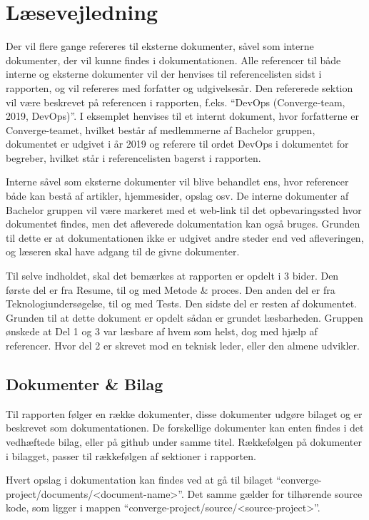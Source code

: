 \chapter{Læsevejledning}

Der vil flere gange refereres til eksterne dokumenter, såvel som interne dokumenter, der vil kunne findes i dokumentationen. Alle referencer til både interne og eksterne dokumenter vil der henvises til referencelisten sidst i rapporten, og vil refereres med forfatter og udgivelsesår. Den refererede sektion vil være beskrevet på referencen i rapporten, f.eks. “DevOps (Converge-team, 2019, DevOps)”. I eksemplet henvises til et internt dokument, hvor forfatterne er Converge-teamet, hvilket består af medlemmerne af Bachelor gruppen, dokumentet er udgivet i år 2019 og referere til ordet DevOps \cite[DevOps]{converge-terms} i dokumentet for begreber, hvilket står i referencelisten bagerst i rapporten.

Interne såvel som eksterne dokumenter vil blive behandlet ens, hvor referencer både kan bestå af artikler, hjemmesider, opslag osv. De interne dokumenter af Bachelor gruppen vil være markeret med et web-link til det opbevaringssted hvor dokumentet findes, men det afleverede dokumentation kan også bruges. Grunden til dette er at dokumentationen ikke er udgivet andre steder end ved afleveringen, og læseren skal have adgang til de givne dokumenter.

Til selve indholdet, skal det bemærkes at rapporten er opdelt i 3 bider. Den første del er fra Resume, til og med Metode \& proces. Den anden del er fra Teknologiundersøgelse, til og med Tests. Den sidste del er resten af dokumentet. Grunden til at dette dokument er opdelt sådan er grundet læsbarheden. Gruppen ønskede at Del 1 og 3 var læsbare af hvem som helst, dog med hjælp af referencer. Hvor del 2 er skrevet mod en teknisk leder, eller den almene udvikler.

\section{Dokumenter \& Bilag}

Til rapporten følger en række dokumenter, disse dokumenter udgøre bilaget og er beskrevet som dokumentationen. De forskellige dokumenter kan enten findes i det vedhæftede bilag, eller på github under samme titel. Rækkefølgen på dokumenter i bilagget, passer til rækkefølgen af sektioner i rapporten.

Hvert opslag i dokumentation kan findes ved at gå til bilaget ``converge-project/documents/<document-name>''. Det samme gælder for tilhørende source kode, som ligger i mappen ``converge-project/source/<source-project>''.

